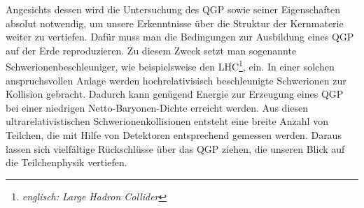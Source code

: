 \documentclass[12pt,a4paper]{report}
\begin{document}
Angesichts dessen wird die Untersuchung des QGP sowie seiner Eigenschaften absolut notwendig, um unsere Erkenntnisse über die Struktur der Kernmaterie weiter zu vertiefen. Dafür muss man die Bedingungen zur Ausbildung eines QGP auf der Erde reproduzieren. Zu diesem Zweck setzt man sogenannte Schwerionenbeschleuniger, wie beispielsweise den LHC\footnote{\textit{englisch: Large Hadron Collider}}, ein. In einer solchen anspruchsvollen Anlage werden hochrelativisisch beschleunigte Schwerionen zur Kollision gebracht. Dadurch kann genügend Energie zur Erzeugung eines QGP bei einer niedrigen Netto-Baryonen-Dichte erreicht werden. Aus diesen ultrarelativistischen Schwerionenkollisionen entsteht eine breite Anzahl von Teilchen, die mit Hilfe von Detektoren entsprechend gemessen werden. Daraus lassen sich vielfältige Rückschlüsse über das QGP ziehen, die unseren Blick auf die Teilchenphysik vertiefen.
\end{document}
